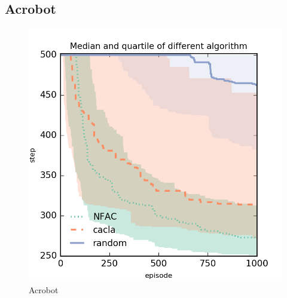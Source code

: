 
\subsection{Acrobot}


\begin{figure}[h]
	\begin{center}
		\includegraphics{result_plotting/adacrobot-1ddl_perf.png}
		\caption{Acrobot}
		\label{image:adacrobot_perf}
	\end{center}
\end{figure}

